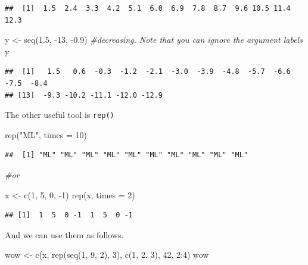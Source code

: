 \documentclass[
]{book}
\newenvironment{Shaded}{\begin{snugshade}}{\end{snugshade}}
\newcommand{\AttributeTok}[1]{\textcolor[rgb]{0.77,0.63,0.00}{#1}}
\newcommand{\CommentTok}[1]{\textcolor[rgb]{0.56,0.35,0.01}{\textit{#1}}}
\newcommand{\DecValTok}[1]{\textcolor[rgb]{0.00,0.00,0.81}{#1}}
\newcommand{\FloatTok}[1]{\textcolor[rgb]{0.00,0.00,0.81}{#1}}
\newcommand{\FunctionTok}[1]{\textcolor[rgb]{0.00,0.00,0.00}{#1}}
\newcommand{\NormalTok}[1]{#1}
\newcommand{\OtherTok}[1]{\textcolor[rgb]{0.56,0.35,0.01}{#1}}
\newcommand{\SpecialCharTok}[1]{\textcolor[rgb]{0.00,0.00,0.00}{#1}}
\newcommand{\StringTok}[1]{\textcolor[rgb]{0.31,0.60,0.02}{#1}}
\theoremstyle{definition}
\theoremstyle{definition}
\theoremstyle{definition}
\theoremstyle{definition}
\theoremstyle{remark}
\begin{document}
\begin{verbatim}
##  [1]  1.5  2.4  3.3  4.2  5.1  6.0  6.9  7.8  8.7  9.6 10.5 11.4 12.3
\end{verbatim}

\begin{Shaded}
\begin{Highlighting}[]
\NormalTok{y }\OtherTok{\textless{}{-}} \FunctionTok{seq}\NormalTok{(}\FloatTok{1.5}\NormalTok{, }\SpecialCharTok{{-}}\DecValTok{13}\NormalTok{, }\SpecialCharTok{{-}}\FloatTok{0.9}\NormalTok{) }\CommentTok{\#decreasing.  Note that you can ignore the argument labels}
\NormalTok{y}
\end{Highlighting}
\end{Shaded}

\begin{verbatim}
##  [1]   1.5   0.6  -0.3  -1.2  -2.1  -3.0  -3.9  -4.8  -5.7  -6.6  -7.5  -8.4
## [13]  -9.3 -10.2 -11.1 -12.0 -12.9
\end{verbatim}

The other useful tool is \texttt{rep()}

\begin{Shaded}
\begin{Highlighting}[]
\FunctionTok{rep}\NormalTok{(}\StringTok{"ML"}\NormalTok{, }\AttributeTok{times =} \DecValTok{10}\NormalTok{)}
\end{Highlighting}
\end{Shaded}

\begin{verbatim}
##  [1] "ML" "ML" "ML" "ML" "ML" "ML" "ML" "ML" "ML" "ML"
\end{verbatim}

\begin{Shaded}
\begin{Highlighting}[]
\CommentTok{\#or}

\NormalTok{x }\OtherTok{\textless{}{-}} \FunctionTok{c}\NormalTok{(}\DecValTok{1}\NormalTok{, }\DecValTok{5}\NormalTok{, }\DecValTok{0}\NormalTok{, }\SpecialCharTok{{-}}\DecValTok{1}\NormalTok{)}
\FunctionTok{rep}\NormalTok{(x, }\AttributeTok{times =} \DecValTok{2}\NormalTok{)}
\end{Highlighting}
\end{Shaded}

\begin{verbatim}
## [1]  1  5  0 -1  1  5  0 -1
\end{verbatim}

And we can use them as follows.

\begin{Shaded}
\begin{Highlighting}[]
\NormalTok{wow }\OtherTok{\textless{}{-}} \FunctionTok{c}\NormalTok{(x, }\FunctionTok{rep}\NormalTok{(}\FunctionTok{seq}\NormalTok{(}\DecValTok{1}\NormalTok{, }\DecValTok{9}\NormalTok{, }\DecValTok{2}\NormalTok{), }\DecValTok{3}\NormalTok{), }\FunctionTok{c}\NormalTok{(}\DecValTok{1}\NormalTok{, }\DecValTok{2}\NormalTok{, }\DecValTok{3}\NormalTok{), }\DecValTok{42}\NormalTok{, }\DecValTok{2}\SpecialCharTok{:}\DecValTok{4}\NormalTok{)}
\NormalTok{wow}
\end{Highlighting}
\end{Shaded}
\end{document}
